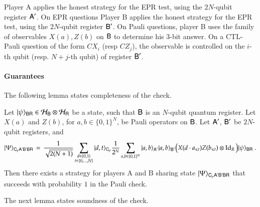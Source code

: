 Player A applies the honest strategy for the EPR test, using the $2N$-qubit register ${\textsf{A}}'$. On EPR questions Player B applies the  honest strategy for the EPR test, using the $2N$-qubit register ${\textsf{B}}'$. On Pauli questions, player B uses the family of observables $X(a),Z(b)$ on ${\textsf{B}}$ to determine his $3$-bit answer. On a CTL-Pauli question of the form $CX_i$ (resp $CZ_j$), the observable is controlled on the $i$-th qubit (resp. $N+j$-th qubit) of register ${\textsf{B}}'$. 

\paragraph{Guarantees}
The following lemma states completeness of the check. 

\begin{lemma}
\label{lem:pauli_check_completeness}
Let $|\psi\rangle_{{\textsf{BR}}} \in \mathcal H_{\textsf{B}} \otimes \mathcal H_{\textsf{R}}$ be a state, such that ${\textsf{B}}$ is an $N$-qubit quantum register. Let $X(a)$ and $Z(b)$, for $a,b\in\{0,1\}^N$, be Pauli operators on ${\textsf{B}}$. Let ${\textsf{A}}'$, ${\textsf{B}}'$ be $2N$-qubit registers, and 
\begin{equation}\label{eq:honest-psi}\ket{\Psi}_{\reg{C}_{p} \reg{A'B'BR}} \,=\, \frac{1}{\sqrt{2(N+1)}} \sum_{\substack{d\in\{0,1\} \\ t\in\{0,\ldots,N\}}} \ket{d,t}_{\reg{C}_{p}}  \frac{1}{2^N} \sum_{a,b \in \{0,1\}^N} \ket{a,b}_{\reg{A}'} \ket{a,b}_{\reg{B}'} \big(X(d\cdot a_{\leq t}) Z(b_{\leq t})\otimes \Id_R\big)\ket{\psi}_\reg{BR}\;.
\end{equation}
Then there exists a strategy for players A and B sharing state $|\Psi\rangle_{{\textsf{C}}_{p} {\textsf{A'B'BR}}}$ that succeeds with probability $1$ in the Pauli check.  
\end{lemma}

The next lemma states soundness of the check.


